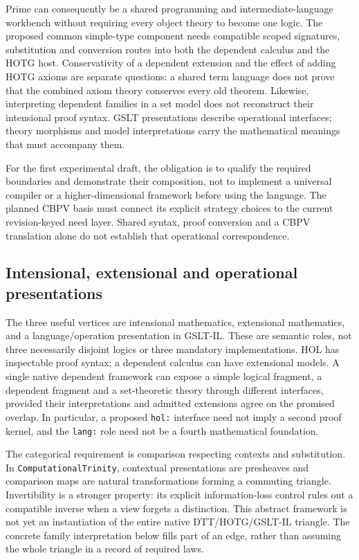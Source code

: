 \documentclass[11pt]{article}
\theoremstyle{definition}
\theoremstyle{remark}
\begin{document}
Prime can consequently be a shared programming and intermediate-language
workbench without requiring every object theory to become one logic. The
proposed common simple-type component needs compatible scoped signatures,
substitution and conversion routes into both the dependent calculus and the
HOTG host. Conservativity of a dependent extension and the effect of adding
HOTG axioms are separate questions: a shared term language does not prove
that the combined axiom theory conserves every old theorem. Likewise,
interpreting dependent families in a set model does not reconstruct their
intensional proof syntax. GSLT presentations describe operational interfaces;
theory morphisms and model interpretations carry the mathematical meanings
that must accompany them.

For the first experimental draft, the obligation is to qualify the required
boundaries and demonstrate their composition, not to implement a universal
compiler or a higher-dimensional framework before using the language. The
planned CBPV basis must connect its explicit strategy choices to the current
revision-keyed need layer. Shared syntax, proof conversion and a CBPV
translation alone do not establish that operational correspondence.

\subsection{Intensional, extensional and operational presentations}

The three useful vertices are intensional mathematics, extensional mathematics,
and a language/operation presentation in GSLT-IL. These are semantic roles,
not three necessarily disjoint logics or three mandatory implementations.
HOL has inspectable proof syntax; a dependent calculus can have extensional
models. A single native dependent framework can expose a simple logical
fragment, a dependent fragment and a set-theoretic theory through different
interfaces, provided their interpretations and admitted extensions agree on
the promised overlap. In particular, a proposed \texttt{hol:} interface need
not imply a second proof kernel, and the \texttt{lang:} role need not be a
fourth mathematical foundation.

The categorical requirement is comparison respecting contexts and
substitution. In \nolinkurl{ComputationalTrinity}, contextual presentations
are presheaves and comparison maps are natural transformations forming a
commuting triangle. Invertibility is a stronger property: its explicit
information-loss control rules out a compatible inverse when a view forgets
a distinction. This abstract framework is not yet an instantiation of the
entire native DTT/HOTG/GSLT-IL triangle. The concrete family interpretation
below fills part of an edge, rather than assuming the whole triangle in a
record of required laws.
\end{document}
